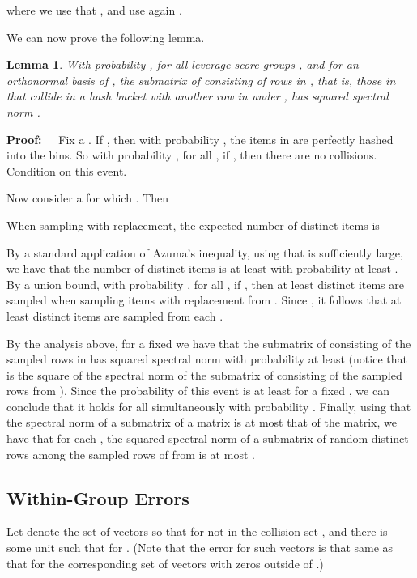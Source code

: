 \documentclass{sig-alternate}
\newtheorem{lemma}[theorem]{Lemma}
\def\FullBox{\hbox{\vrule width 8pt height 8pt depth 0pt}}
\def\qed{\ifmmode\qquad\FullBox\else{\unskip\nobreak\hfil
\penalty50\hskip1em\null\nobreak\hfil\FullBox
\parfillskip=0pt\finalhyphendemerits=0\endgraf}\fi}
\newenvironment{proof}{\begin{trivlist} \item {\bf Proof:~~}}
  {\qed\end{trivlist}}
\begin{document}
where we use that
	, and use again
	.




We can now prove the following lemma. 
\begin{lemma}\label{lem:collide norm}
With probability , for all leverage score groups ,
and for  an orthonormal basis of , the submatrix 
of  consisting of rows in , that is, those in  that
collide in a hash bucket with another
row in  under , has squared spectral norm 
.
\end{lemma}

\begin{proof}
Fix a . If , then with probability , the items
in  are perfectly hashed into the  bins. So with probability , for all
, if , then there are no collisions. Condition on this event.

Now consider a  for which . Then 

When sampling with replacement,
the expected number of distinct items is

By a standard
application of Azuma's inequality, using that  is sufficiently large, 
we have that the number
of distinct items is at least  with probability at least . By a union
bound, with probability , for all , if , then at least 
 distinct items are sampled when sampling  items with replacement from . Since
, it follows that at least  distinct items are sampled from each .

By the analysis above, for a fixed  we have that the submatrix of  consisting of the 
sampled rows in  has squared spectral norm  with probability at least
 (notice that  is the square of the spectral
norm of the submatrix of  consisting of the  sampled rows from ). Since the probability of 
this event is at least  for a fixed , we can conclude that it holds for all 
simultaneously with probability .
Finally, using that the spectral norm of a submatrix of a matrix is at most that of the matrix, we 
have that for each , the squared spectral norm of a submatrix of  random distinct rows among the 
sampled rows of  from  is at most . 
\end{proof}


\subsection{Within-Group Errors}

Let  denote the set of vectors  so that 
for  not in the collision set ,
and there is some unit  such that 
for . (Note that the error for such vectors is that
same as that for the corresponding set of vectors 
with zeros outside of .)
\end{document}
